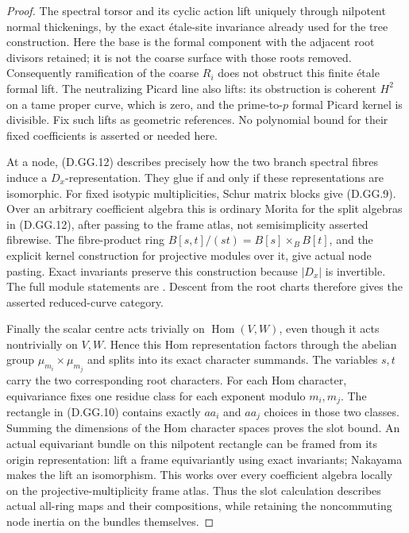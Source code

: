 \begin{proof}
The spectral torsor and its cyclic action lift uniquely
through nilpotent normal thickenings, by the exact
étale-site invariance already used for the tree
construction. Here the base is the formal component
with the adjacent root divisors retained; it is not
the coarse surface with those roots removed.
Consequently ramification of the coarse \(R_i\) does
not obstruct this finite étale formal lift. The
neutralizing Picard line also lifts: its obstruction
is coherent \(H^2\) on a tame proper curve, which is
zero, and the prime-to-\(p\) formal Picard kernel is
divisible. Fix such lifts as geometric references.
No polynomial bound for their fixed coefficients
is asserted or needed here.

At a node, (D.GG.12) describes precisely how the two
branch spectral fibres induce a \(D_x\)-representation.
They glue if and only if these representations are
isomorphic. For fixed isotypic multiplicities, Schur
matrix blocks give (D.GG.9). Over an arbitrary
coefficient algebra this is ordinary Morita for the
split algebras in (D.GG.12), after passing to the
frame atlas, not semisimplicity asserted fibrewise.
The fibre-product ring
\(B[s,t]/(st)=B[s]\times_B B[t]\), and the explicit
kernel construction for projective modules over it,
give actual node pasting. Exact invariants preserve
this construction because \(|D_x|\) is invertible.
The full module statements are
\citet[Lemmas15.6.4--15.6.9, complete proofs]
{StacksTreePastingD}. Descent from the root charts
therefore gives the asserted reduced-curve category.

Finally the scalar centre acts trivially on
\(\operatorname{Hom}(V,W)\), even though it acts
nontrivially on \(V,W\). Hence this Hom representation
factors through the abelian group
\(\mu_{m_i}\times\mu_{m_j}\) and splits into its exact
character summands. The variables \(s,t\) carry the
two corresponding root characters. For each Hom
character, equivariance fixes one residue class for
each exponent modulo \(m_i,m_j\). The rectangle in
(D.GG.10) contains exactly \(a a_i\) and \(a a_j\)
choices in those two classes. Summing the dimensions
of the Hom character spaces proves the slot bound.
An actual equivariant bundle on this nilpotent
rectangle can be framed from its origin representation:
lift a frame equivariantly using exact invariants;
Nakayama makes the lift an isomorphism. This works
over every coefficient algebra locally on the
projective-multiplicity frame atlas. Thus the slot
calculation describes actual all-ring maps and their
compositions, while retaining the noncommuting node
inertia on the bundles themselves.
\end{proof}
